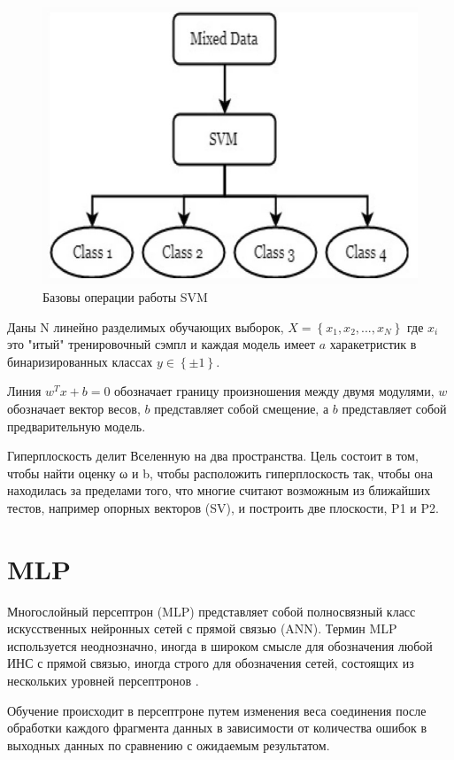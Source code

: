 \begin{figure}[h]
\includegraphics[width=0.75\columnwidth]{./img/svm_diagramma.jpg}
\centering
\caption{Базовы операции работы SVM}
\label{pic:svm_diagramma}
\end{figure}

Даны N линейно разделимых обучающих выборок, $X = \left \{ x_1, x_2, ..., x_N \right \}$ 
где $x_i$ это "итый" тренировочный сэмпл и каждая модель имеет $a$ харакетристик в 
бинаризированных классах $y \in \left \{ \pm 1 \right \}$. 

Линия $w^T x + b = 0$ обозначает границу произношения между двумя модулями, 
$w$ обозначает вектор весов, $b$ представляет собой смещение, 
а $b$ представляет собой предварительную модель.

Гиперплоскость делит Вселенную на два пространства. 
Цель состоит в том, чтобы найти оценку ω и b, 
чтобы расположить гиперплоскость так, чтобы она находилась 
за пределами того, что многие считают возможным из ближайших тестов, 
например опорных векторов (SV), и построить две плоскости, P1 и P2.

\section{MLP}
Многослойный персептрон (MLP) представляет собой полносвязный класс искусственных нейронных сетей с прямой связью (ANN). 
Термин MLP используется неоднозначно, иногда в широком смысле для обозначения любой ИНС с прямой связью, иногда 
строго для обозначения сетей, состоящих из нескольких уровней персептронов \cite{wiki_mlp}.

Обучение происходит в персептроне путем изменения веса соединения после обработки каждого фрагмента
данных в зависимости от количества ошибок в выходных данных по сравнению с ожидаемым результатом.

